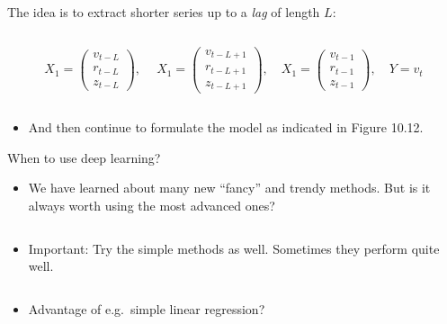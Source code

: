 \documentclass[
  10pt,
  ignorenonframetext,
]{beamer}
\providecommand{\tightlist}{%
  \setlength{\itemsep}{0pt}\setlength{\parskip}{0pt}}
\begin{document}
\begin{frame}
The idea is to extract shorter series up to a \emph{lag} of length
\(L\):

\(~\)

\[X_1 = \left( 
\begin{matrix}
v_{t-L}\\
r_{t-L}\\
z_{t-L}
\end{matrix}
\right), \ 
\quad X_1 = \left( 
\begin{matrix}
v_{t-L+1}\\
r_{t-L+1}\\
z_{t-L+1}
\end{matrix}
\right), 
\quad 
X_1 = \left( 
\begin{matrix}
v_{t-1}\\
r_{t-1}\\
z_{t-1}
\end{matrix}
\right), 
\quad 
Y = v_t\]

\(~\)

\begin{itemize}
\tightlist
\item
  And then continue to formulate the model as indicated in Figure 10.12.
\end{itemize}
\end{frame}

\begin{frame}{When to use deep learning?}
\protect\hypertarget{when-to-use-deep-learning}{}
\(~\)

\begin{itemize}
\tightlist
\item
  We have learned about many new ``fancy'' and trendy methods. But is it
  always worth using the most advanced ones?
\end{itemize}

\(~\)

\begin{itemize}
\tightlist
\item
  Important: Try the simple methods as well. Sometimes they perform
  quite well.
\end{itemize}

\(~\)

\begin{itemize}
\tightlist
\item
  Advantage of e.g.~simple linear regression?
\end{itemize}
\end{frame}
\end{document}
